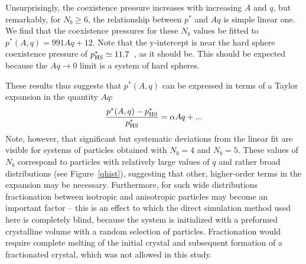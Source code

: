 Unsurprisingly, the coexistence pressure increases with increasing $A$ and $q$, but remarkably, for $N_b \geq 6$, the relationship between $p^*$ and $Aq$ is simple linear one.
We find that the coexistence pressures for these $N_b$ values  be fitted to  $p^* (A,q)= 991Aq + 12$.
Note that the y-intercept is near the hard sphere coexistence pressure of $p^*_{\rm HS}\simeq  11.7$~\cite{HScoex}, as it should be.
This should be expected because the $Aq \rightarrow 0$ limit is a system of hard spheres.

These results thus suggests that $p^*(A,q)$ can be expressed in terms of a Taylor expansion in the quantity $Aq$: 
\begin{equation}
	\frac{p^*(A,q)-p^*_{\rm HS}}{p^*_{\rm HS}} = \alpha Aq + ...
\end{equation}
Note, however, that significant but systematic deviations from the linear fit are visible for systems of particles obtained with  $N_b = 4$ and $N_b = 5$. 
These values of $N_b$ correspond to particles with  relatively large values of $q$ and rather broad distributions (see Figure~\ref{qhist}), suggesting that other, higher-order terms in the expansion may be necessary. 
Furthermore, for such wide distributions fractionation  between isotropic and anisotropic particles may become an important factor -- this is an effect to which the direct simulation method used here is completely blind, because the system is initialized with a preformed crystalline volume with a random selection of particles.
Fractionation would require complete melting of the initial crystal and subsequent formation of a fractionated crystal, which was not allowed in this study.
